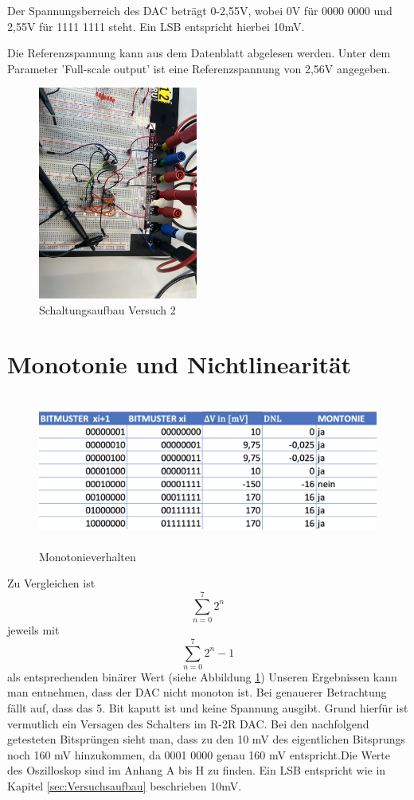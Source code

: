Der Spannungsberreich des DAC beträgt 0-2,55V, wobei 0V für 0000 0000 
und 2,55V für 1111 1111 steht. Ein LSB entspricht hierbei 10mV.

Die Referenzspannung kann aus dem Datenblatt abgelesen werden. Unter dem 
Parameter 'Full-scale output' ist eine Referenzspannung von 2,56V angegeben.


\begin{figure}[H]
	\centering
	\includegraphics[height=7cm]{images/versuch2-schaltungsaufbau.jpeg} 
	\caption[]{Schaltungsaufbau Versuch 2}
\end{figure}



\section{Monotonie und Nichtlinearität}

\begin{figure}[H]
	\centering
	\includegraphics[height=5cm]{images/versuch2-monotonie-and-nichtlinearitaet.png} 
	\caption[]{Monotonieverhalten}
    \label{fig: Monotonieverhalten}
\end{figure}

Zu Vergleichen ist 
\[
\sum_{n=0}^{7} 2^n
\]
jeweils mit 
\[
\sum_{n=0}^{7} 2^n -1
\] als entsprechenden binärer Wert (siehe Abbildung \ref{fig: Monotonieverhalten})\newline
Unseren Ergebnissen kann man entnehmen, dass der DAC nicht
monoton ist. Bei genauerer Betrachtung fällt auf, dass das 5.
Bit kaputt ist und keine Spannung ausgibt. Grund hierfür ist 
vermutlich ein Versagen des Schalters im R-2R DAC.
Bei den nachfolgend getesteten Bitsprüngen sieht man, dass zu den
10 mV des eigentlichen Bitsprungs noch 160 mV hinzukommen, da 0001 0000
genau 160 mV entspricht.Die Werte des Oszilloskop sind im Anhang A bis H zu finden.
Ein LSB entspricht wie in Kapitel \ref{sec:Versuchsaufbau} beschrieben 10mV.

